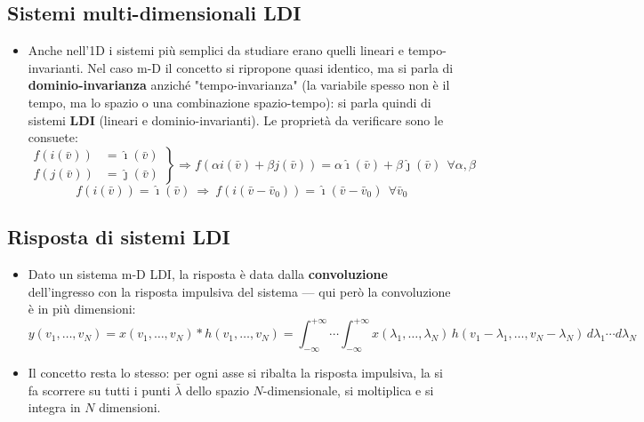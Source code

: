 \documentclass[12pt, a4paper]{article}
\begin{document}
\subsection{Sistemi multi-dimensionali LDI}
\begin{itemize}
    \item Anche nell'1D i sistemi più semplici da studiare erano quelli lineari e tempo-invarianti. Nel caso m-D il concetto si ripropone quasi identico, ma si parla di \textbf{dominio-invarianza} anziché "tempo-invarianza" (la variabile spesso non è il tempo, ma lo spazio o una combinazione spazio-tempo): si parla quindi di sistemi \textbf{LDI} (lineari e dominio-invarianti). Le proprietà da verificare sono le consuete:
    $$\left.\begin{aligned}f(i(\bar v)) &= \hat\imath(\bar v) \\ f(j(\bar v)) &= \hat\jmath(\bar v)\end{aligned}\right\} \Rightarrow f(\alpha i(\bar v)+\beta j(\bar v)) = \alpha\hat\imath(\bar v)+\beta\hat\jmath(\bar v)\ \ \forall\alpha,\beta$$
    $$f(i(\bar v))=\hat\imath(\bar v) \ \Rightarrow\ f(i(\bar v-\bar v_0))=\hat\imath(\bar v-\bar v_0)\ \ \forall\bar v_0$$
\end{itemize}

\subsection{Risposta di sistemi LDI}
\begin{itemize}
    \item Dato un sistema m-D LDI, la risposta è data dalla \textbf{convoluzione} dell'ingresso con la risposta impulsiva del sistema — qui però la convoluzione è in più dimensioni:
    $$y(v_1,\dots,v_N) = x(v_1,\dots,v_N)*h(v_1,\dots,v_N) = \int_{-\infty}^{+\infty}\!\!\cdots\!\int_{-\infty}^{+\infty} x(\lambda_1,\dots,\lambda_N)\,h(v_1-\lambda_1,\dots,v_N-\lambda_N)\,d\lambda_1\cdots d\lambda_N$$
    \item Il concetto resta lo stesso: per ogni asse si ribalta la risposta impulsiva, la si fa scorrere su tutti i punti $\bar\lambda$ dello spazio $N$-dimensionale, si moltiplica e si integra in $N$ dimensioni.
\end{itemize}
\end{document}
